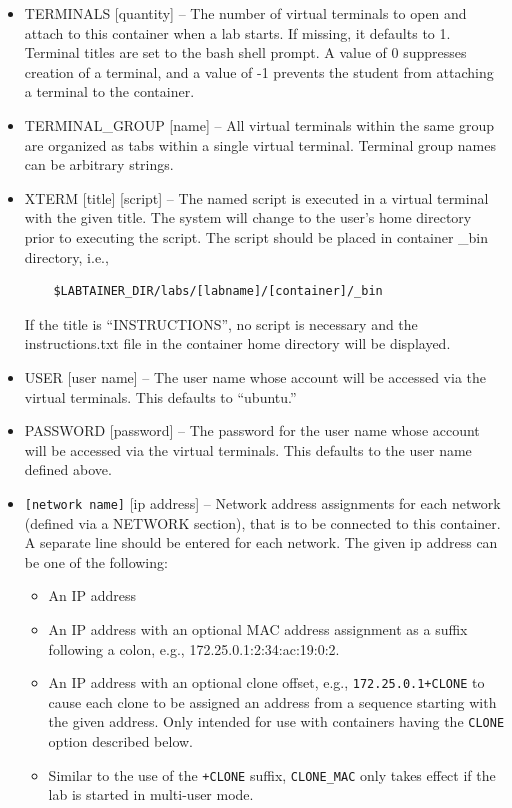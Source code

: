 \documentclass[12pt]{article}
\begin{document}
\begin{itemize}
\begin{itemize}
\item TERMINALS [quantity] -- The number of virtual terminals to open and attach to this 
container when a lab starts.  If missing, it defaults to 1. Terminal titles are set to the 
bash shell prompt. A value of 0 suppresses creation of a terminal, and a value of -1 prevents
the student from attaching a terminal to the container. 
\item TERMINAL\_GROUP [name] -- All virtual terminals within the same group are organized as
tabs within a single virtual terminal.  Terminal group names can be arbitrary strings.
\item XTERM [title] [script] -- The named script is executed in a virtual terminal with the
given title.   The system will change to the user's home directory prior to executing the
script.  The script should be placed in container \_bin directory, i.e.,
\begin{verbatim}
    $LABTAINER_DIR/labs/[labname]/[container]/_bin
\end{verbatim}
\noindent If the title is ``INSTRUCTIONS'', no script is necessary and the instructions.txt file
in the container home directory will be displayed.
\item USER [user name] -- The user name whose account will be accessed via the virtual terminals. 
This defaults to ``ubuntu.''
\item PASSWORD [password] -- The password for the user name whose account will be accessed via the virtual terminals. 
This defaults to the user name defined above.
\item \verb![network name]! [ip address] -- Network address assignments for each network (defined via a NETWORK section), 
that is to be connected to this container.  A separate line should be entered for each network.  The given ip address 
can be one of the following:
\begin{itemize}
\item An IP address 
\item An IP address with an optional MAC address assignment as a suffix following a colon, e.g., 172.25.0.1:2:34:ac:19:0:2.
\item An IP address with an optional clone offset, e.g., {\tt 172.25.0.1+CLONE} to cause each clone to be assigned an address
from a sequence starting with the given address.  Only intended for use with containers having the {\tt CLONE} option described below.
\item Similar to the use of the {\tt +CLONE} suffix, {\tt CLONE\_MAC} only takes effect if the lab is started in multi-user mode.  

\end{itemize}
\end{itemize}
\end{itemize}
\end{document}
